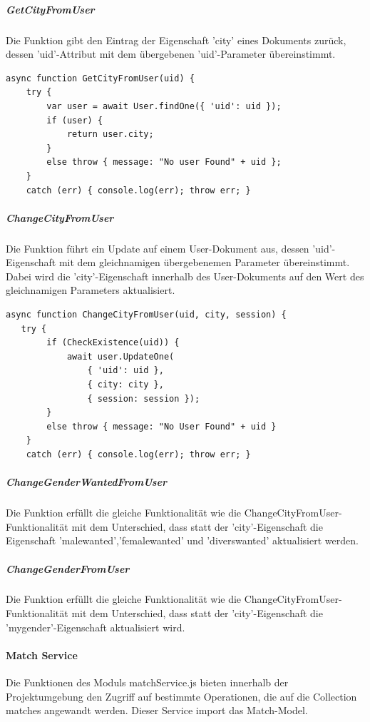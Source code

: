 \noindent
\subparagraph{GetCityFromUser}
Die Funktion gibt den Eintrag der Eigenschaft 'city' eines Dokuments zurück, dessen 'uid'-Attribut mit dem übergebenen 'uid'-Parameter übereinstimmt.

\begin{lstlisting}[caption=User Service - CheckExistence, label=lst:userservicecheckexistence]
async function GetCityFromUser(uid) {
    try {
        var user = await User.findOne({ 'uid': uid });
        if (user) {
            return user.city;
        }
        else throw { message: "No user Found" + uid };
    }
    catch (err) { console.log(err); throw err; }
\end{lstlisting}

\noindent
\subparagraph{ChangeCityFromUser}
Die Funktion führt ein Update auf einem User-Dokument aus, dessen 'uid'-Eigenschaft mit dem gleichnamigen übergebenemen Parameter übereinstimmt. Dabei wird die 'city'-Eigenschaft innerhalb des User-Dokuments auf den Wert des gleichnamigen Parameters aktualisiert.

\begin{lstlisting}[caption=User Service - ChangeCityFromUser, label=lst:userservicechangecityfromuser]
async function ChangeCityFromUser(uid, city, session) {  
   try {
        if (CheckExistence(uid)) {
            await user.UpdateOne(
                { 'uid': uid },
                { city: city },
                { session: session });
        }
        else throw { message: "No User Found" + uid }
    }
    catch (err) { console.log(err); throw err; }
\end{lstlisting}

\noindent
\subparagraph{ChangeGenderWantedFromUser}
Die Funktion erfüllt die gleiche Funktionalität wie die ChangeCityFromUser-Funktionalität mit dem Unterschied, dass statt der 'city'-Eigenschaft die Eigenschaft 'malewanted','femalewanted' und 'diverswanted' aktualisiert werden.

\noindent
\subparagraph{ChangeGenderFromUser}
Die Funktion erfüllt die gleiche Funktionalität wie die ChangeCityFromUser-Funktionalität mit dem Unterschied, dass statt der 'city'-Eigenschaft die 'mygender'-Eigenschaft aktualisiert wird.


%
%


\paragraph{Match Service}
Die Funktionen des Moduls matchService.js bieten innerhalb der Projektumgebung den Zugriff auf bestimmte Operationen, die auf die Collection matches angewandt werden. Dieser Service import das Match-Model.


